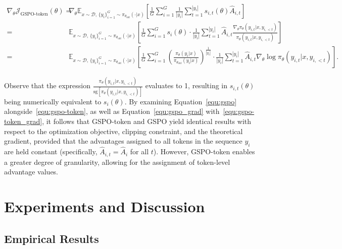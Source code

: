 \begin{align}
\nabla_{\theta} \mathcal{J}_\text{GSPO-token}(\theta)
=&\ 
\nabla_{\theta} \mathbb{E}_{ x \sim \mathcal{D},\, \{y_i\}_{i=1}^G \sim \pi_{\theta_\text{old}}( \cdot | x) }
\left[ 
\frac{1}{G} \sum_{i=1}^{G}
\frac{1}{|y_i|} \sum_{t=1}^{|y_i|} 
s_{i,t}(\theta) \widehat{A}_{i,t}
\right] \\
=&\ 
\mathbb{E}_{ x \sim \mathcal{D},\, \{y_i\}_{i=1}^G \sim \pi_{\theta_\text{old}}( \cdot | x) }
\left[ 
\frac{1}{G} \sum_{i=1}^{G} s_i (\theta) \cdot \frac{1}{|y_i|} \sum_{t=1}^{|y_i|} 
\widehat{A}_{i,t} \frac{ \nabla_{\theta} \pi_{\theta} (y_{i,t} | x, y_{i,<t}) }{ \pi_{\theta} (y_{i,t} | x, y_{i,<t}) }
\right] \\
=&\ 
\mathbb{E}_{ x \sim \mathcal{D},\, \{y_i\}_{i=1}^G \sim \pi_{\theta_\text{old}}( \cdot | x) }
\left[ 
\frac{1}{G} \sum_{i=1}^{G}  \left( \frac{ \pi_{\theta} (y_i | x) }{ \pi_{\theta_\text{old}} (y_i | x)} \right)^{\frac{1}{|y_i|}}
\cdot \frac{1}{|y_i|} \sum_{t=1}^{|y_i|}
\widehat{A}_{i,t} \nabla_{\theta} \log \pi_{\theta} (y_{i,t} | x, y_{i,<t})  
\right].
\label{equ:gspo-token_grad}
\end{align}

Observe that the expression $\frac{ \pi_{\theta} (y_{i,t} | x, y_{i,<t}) }{ \mathrm{sg} \left[ \pi_{\theta} (y_{i,t} | x, y_{i,<t}) \right] }$ evaluates to 1, resulting in $s_{i,t}(\theta)$ being numerically equivalent to $s_{i}(\theta)$.
By examining Equation~\eqref{equ:gspo} alongside~\eqref{equ:gspo-token}, as well as Equation~\eqref{equ:gspo_grad} with~\eqref{equ:gspo-token_grad}, it follows that GSPO-token and GSPO yield identical results with respect to the optimization objective, clipping constraint, and the theoretical gradient, provided that the advantages assigned to all tokens in the sequence $y_i$ are held constant (specifically, $\widehat{A}_{i,t} = \widehat{A}_{i}$ for all $t$). However, GSPO-token enables a greater degree of granularity, allowing for the assignment of token-level advantage values.

\section{Experiments and Discussion}

\subsection{Empirical Results}

